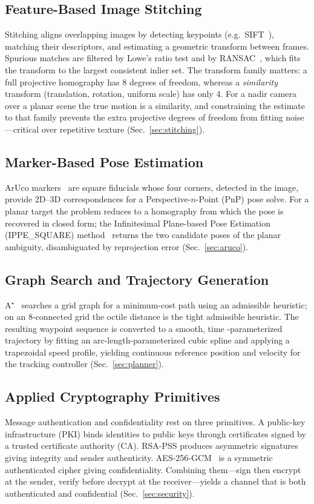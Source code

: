 \documentclass[conference]{IEEEtran}
\begin{document}
\subsection{Feature-Based Image Stitching}
Stitching aligns overlapping images by detecting keypoints (e.g.\ SIFT~\cite{sift}),
matching their descriptors, and estimating a geometric transform between frames.
Spurious matches are filtered by Lowe's ratio test and by RANSAC~\cite{ransac}, which fits the
transform to the largest consistent inlier set. The transform family matters: a
full projective homography has 8 degrees of freedom, whereas a \emph{similarity}
transform (translation, rotation, uniform scale) has only 4. For a nadir camera
over a planar scene the true motion is a similarity, and constraining the
estimate to that family prevents the extra projective degrees of freedom from
fitting noise---critical over repetitive texture (Sec.~\ref{sec:stitching}).

\subsection{Marker-Based Pose Estimation}
ArUco markers~\cite{aruco} are square fiducials whose four corners, detected in the image,
provide 2D--3D correspondences for a Perspective-$n$-Point (PnP) pose solve. For
a planar target the problem reduces to a homography from which the pose is
recovered in closed form; the Infinitesimal Plane-based Pose Estimation
(IPPE\_SQUARE) method~\cite{ippe} returns the two candidate poses of the planar ambiguity,
disambiguated by reprojection error (Sec.~\ref{sec:aruco}).

\subsection{Graph Search and Trajectory Generation}
A$^\star$~\cite{astar} searches a grid graph for a minimum-cost path using an admissible
heuristic; on an 8-connected grid the octile distance is the tight admissible
heuristic. The resulting waypoint sequence is converted to a smooth, time
-parameterized trajectory by fitting an arc-length-parameterized cubic spline
and applying a trapezoidal speed profile, yielding continuous reference position
and velocity for the tracking controller (Sec.~\ref{sec:planner}).

\subsection{Applied Cryptography Primitives}
Message authentication and confidentiality rest on three primitives. A
public-key infrastructure (PKI) binds identities to public keys through
certificates signed by a trusted certificate authority (CA). RSA-PSS produces
asymmetric signatures giving integrity and sender authenticity. AES-256-GCM~\cite{nist} is a
symmetric authenticated cipher giving confidentiality. Combining them---sign
then encrypt at the sender, verify before decrypt at the receiver---yields a
channel that is both authenticated and confidential (Sec.~\ref{sec:security}).
\end{document}
